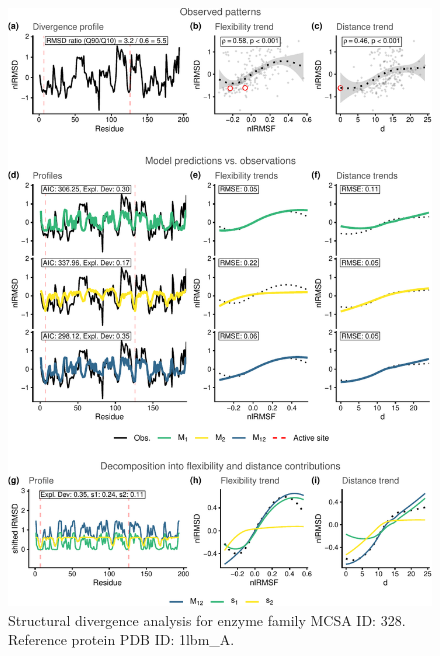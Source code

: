 \documentclass[
]{article}
\begin{document}
\clearpage
\begin{figure}[H]
\centering


\begin{center}\includegraphics{supplementary_material_files/figure-latex/generate_figures-16} \end{center}

\caption{Structural divergence analysis for enzyme family MCSA ID: 328. Reference protein PDB ID: 1lbm\_A.}
\end{figure}
\end{document}
